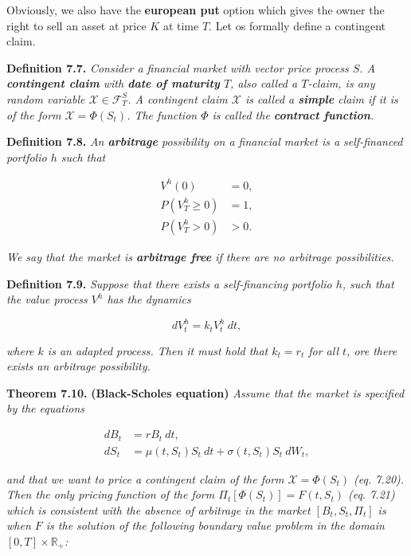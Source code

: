 \documentclass[
]{article}
\begin{document}
Obviously, we also have the \textbf{european put} option which gives the
owner the right to sell an asset at price \(K\) at time \(T\). Let os
formally define a contingent claim.

\textbf{Definition 7.7.} \emph{Consider a financial market with vector
price process \(S\). A \textbf{contingent claim} with \textbf{date of
maturity} \(T\), also called a \(T\)-claim, is any random variable
\(\mathcal{X}\in\mathcal{F}_T^S\). A contingent claim \(\mathcal{X}\) is
called a \textbf{simple} claim if it is of the form
\(\mathcal{X} = \Phi(S_t)\). The function \(\Phi\) is called the
\textbf{contract function}.}

\textbf{Definition 7.8.} \emph{An \textbf{arbitrage} possibility on a
financial market is a self-financed portfolio \(h\) such that}

\begin{align*}
V^h(0)&=0,\tag{7.13}\\
P(V_T^h\ge0)&=1,\tag{7-14}\\
P(V_T^h>0)&>0.\tag{7.15}
\end{align*}

\emph{We say that the market is \textbf{arbitrage free} if there are no
arbitrage possibilities.}

\textbf{Definition 7.9.} \emph{Suppose that there exists a
self-financing portfolio \(h\), such that the value process \(V^h\) has
the dynamics}

\[
d V_t^h=k_tV_t^h\ dt,\tag{7.16}
\]

\emph{where \(k\) is an adapted process. Then it must hold that
\(k_t=r_t\) for all \(t\), ore there exists an arbitrage possibility.}

\textbf{Theorem 7.10.} \textbf{(Black-Scholes equation)} \emph{Assume
that the market is specified by the equations}

\begin{align*}
dB_t&=rB_t\ dt,\tag{7.18}\\
dS_t&=\mu(t,S_t) S_t\ dt+\sigma(t,S_t)S_t\ dW_t,\tag{7.19}
\end{align*}

\emph{and that we want to price a contingent claim of the form
\(\mathcal{X}=\Phi(S_t)\) (eq. 7.20). Then the only pricing function of
the form \(\Pi_t[\Phi(S_t)]=F(t,S_t)\) (eq. 7.21) which is consistent
with the absence of arbitrage in the market \([B_t,S_t,\Pi_t]\) is when
\(F\) is the solution of the following boundary value problem in the
domain \([0,T]\times\mathbb{R}_+\):}
\end{document}
